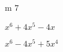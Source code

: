 \documentclass{article}
\begin{document}
\begin{multicols}{2}
m $7$\item $x^{6}+4x^{5}-4x$\item $x^{6}-4x^{5}+5x^{4}$
\end{multicols}
\end{document}
